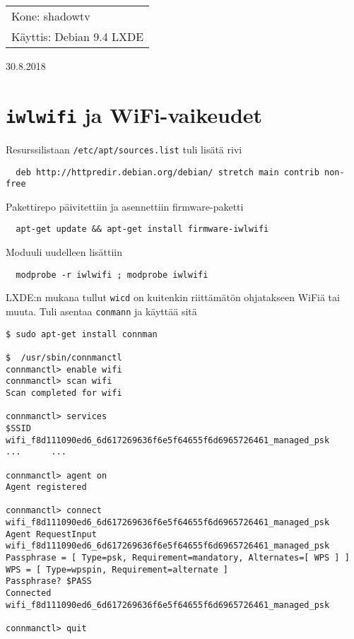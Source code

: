 \documentclass[main.tex]{subfiles}
\begin{document}
\thispagestyle{empty}
\begin{tabular}[t]{l}
Kone: shadowtv\\
Käyttis: Debian 9.4 LXDE
\end{tabular}
\hfill 30.8.2018

\section{\texttt{iwlwifi} ja WiFi-vaikeudet}
Resurssilistaan \texttt{/etc/apt/sources.list} tuli lisätä rivi
\begin{lstlisting}
  deb http://httpredir.debian.org/debian/ stretch main contrib non-free
\end{lstlisting}

Pakettirepo päivitettiin ja asennettiin firmware-paketti
\begin{lstlisting}
  apt-get update && apt-get install firmware-iwlwifi
\end{lstlisting}

Moduuli uudelleen lisättiin
\begin{lstlisting}
  modprobe -r iwlwifi ; modprobe iwlwifi
\end{lstlisting}

LXDE:n mukana tullut \texttt{wicd} on kuitenkin riittämätön ohjatakseen WiFiä tai muuta. Tuli asentaa \texttt{conmann} ja käyttää sitä
\begin{lstlisting}
$ sudo apt-get install connman

$  /usr/sbin/connmanctl 
connmanctl> enable wifi
connmanctl> scan wifi 
Scan completed for wifi

connmanctl> services 
$SSID    wifi_f8d111090ed6_6d617269636f6e5f64655f6d6965726461_managed_psk
...      ...

connmanctl> agent on
Agent registered

connmanctl> connect wifi_f8d111090ed6_6d617269636f6e5f64655f6d6965726461_managed_psk 
Agent RequestInput wifi_f8d111090ed6_6d617269636f6e5f64655f6d6965726461_managed_psk
Passphrase = [ Type=psk, Requirement=mandatory, Alternates=[ WPS ] ]
WPS = [ Type=wpspin, Requirement=alternate ]
Passphrase? $PASS
Connected wifi_f8d111090ed6_6d617269636f6e5f64655f6d6965726461_managed_psk

connmanctl> quit
\end{lstlisting}
\end{document}

